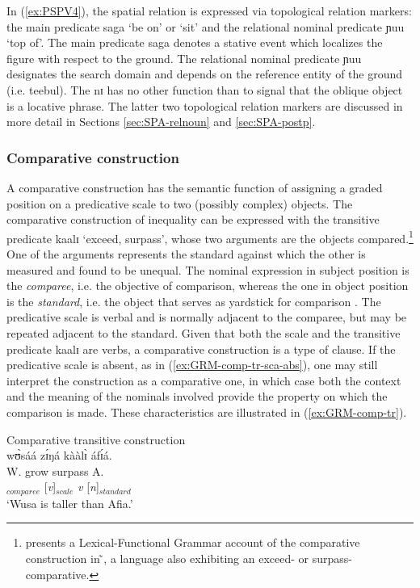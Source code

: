 In (\ref{ex:PSPV4}), the spatial relation is expressed via topological relation markers:  the main predicate {\sls saga} `be on' or `sit' and the relational nominal predicate {\sls ɲuu} `top of'. The main predicate  {\sls saga}  denotes a stative event which  localizes the figure with respect to the ground.  The relational nominal predicate {\sls ɲuu} designates the search domain and depends on the reference entity of the ground (i.e. {\sls teebul}). The   {\sls nɪ} has no other function than to signal that the oblique object is a locative phrase. The latter two topological relation markers are discussed in more detail in Sections   \ref{sec:SPA-relnoun} and \ref{sec:SPA-postp}.

\subsubsection{Comparative construction}
\label{sec:GRM-compar-ct}

A comparative construction has the semantic function of assigning a graded
position on a predicative scale to two (possibly complex) objects.
The comparative construction of inequality can be expressed with the
transitive predicate {\sls kaalɪ} `exceed, surpass', whose  two arguments are
the objects compared.\footnote{\citet{Brin05} presents a Lexical-Functional Grammar  account of the comparative construction in ̃, a language also
exhibiting an  exceed-  or surpass-comparative.}  One of the arguments 
represents the
standard
against which the other is
measured and found to be unequal.  The nominal expression in subject position is
the {\it comparee}, i.e. the objective of comparison, whereas the
one in object position is the {\it standard}, i.e. the object that
serves as yardstick for comparison \citep{Stas08}. The predicative scale is verbal and is normally adjacent to  the comparee, but may
be repeated adjacent to the standard. Given that both the scale and the
transitive predicate {\sls kaalɪ} are verbs, a comparative construction is  a
 type of  clause.  If the predicative scale is absent, as in
(\ref{ex:GRM-comp-tr-sca-abs}),  one
may still interpret the construction as a comparative one, in which case both
the
context
and the meaning of  the nominals involved  provide the property on which
the
comparison  is made. These characteristics are illustrated in
(\ref{ex:GRM-comp-tr}).


\ea\label{ex:GRM-comp-tr}{\rm Comparative transitive construction}\\
\ea\label{ex:GRM-comp-tr-sca-pres}{
\glll wʊ̀sáá zɪ́ŋá kààlɪ̀ áfɪ́á.\\
  W. grow surpass A.\\
[{\it n}]$_{comparee}$  [{\it v}]$_{scale}$ {\it v} [{\it n}]$_{standard}$\\
\glt `Wusa is taller than Afia.'
}

